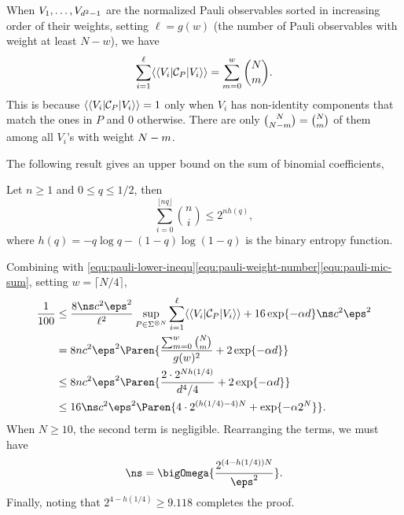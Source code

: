 When $V_1, \ldots, V_{d^2-1}$ are the normalized Pauli observables sorted in increasing order of their weights, setting $\ell=g(w)$ (the number of Pauli observables with weight at least $N-w$), we have
\begin{align*}
    \sum_{i=1}^{\ell}\langle\langle V_i| {{\mathcal{C}}}_P |V_i\rangle\rangle=\sum_{m=0}^{w}{{N}\choose m}.
\end{align*}
This is because $\langle\langle V_i| {{\mathcal{C}}}_P |V_i\rangle\rangle=1$ 
only when $V_i$ has non-identity components that match the ones in $P$ and 0 otherwise. 
There are only ${{N}\choose N-m}={{N}\choose m}$ of them among all $V_i$'s with weight ${N}-m$.

The following result gives an upper bound on the sum of binomial coefficients,
\begin{lemma}
\label{lem:sum-binomial-coef}
    Let $n\ge 1$ and $0\le q\le 1/2$, then
    \[
    \sum_{i=0}^{\lfloor nq\rfloor}{n\choose i}\le 2^{n h(q)},
    \]
    where $h(q)=-q\log q -(1-q)\log(1-q)$ is the binary entropy function.
\end{lemma}

Combining with \eqref{equ:pauli-lower-inequ}\eqref{equ:pauli-weight-number}\eqref{equ:pauli-mic-sum}, setting $w=\lceil N/4\rceil$,
\begin{align*}
    \frac{1}{100}&\le \frac{8 \ns c^2 \eps^2}{\ell^2} \sup_{P\in\Sigma^{\otimes\nqubits}}\sum_{i=1}^{\ell}\vadj{V_i} {\Choi}_P \vvec{V_i} +16\exp\{-\alpha\dims\}\ns c^2\eps^2\\
    &=8nc^2\eps^2\Paren{\frac{\sum_{m=0}^{w}{\nqubits\choose m}}{g(w)^2}+2\exp\{-\alpha\dims\}}\\
    &\le 8nc^2\eps^2\Paren{\frac{2\cdot 2^{\nqubits h(1/4)}}{\dims^4/4}+2\exp\{-\alpha\dims\}}\\
    &\le 16\ns \cd^2\eps^2\Paren{4\cdot 2^{(h(1/4)-4)\nqubits}+\exp\{-\alpha2^{\nqubits}\}}.
\end{align*}
When $N\ge 10$, the second term is negligible. Rearranging the terms, we must have
\[
\ns = \bigOmega{\frac{2^{(4-h(1/4))\nqubits}}{\eps^2}}.
\]
Finally, noting that $2^{4-h(1/4)}\ge 9.118$ completes the proof.
